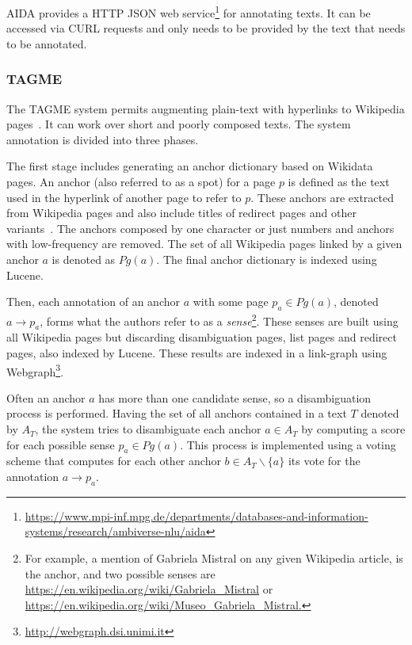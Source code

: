 AIDA provides a HTTP JSON web service\footnote{\url{https://www.mpi-inf.mpg.de/departments/databases-and-information-systems/research/ambiverse-nlu/aida}} for annotating texts. It can be accessed via CURL requests and only needs to be provided by the 
text that needs to be annotated.

\subsubsection{TAGME}
\label{cap2:theoFrame/infExtr/entityLinking/tagme}
The TAGME system permits augmenting plain-text with hyperlinks to Wikipedia 
pages~\cite{EL:tagme-FerraginaS10}. It can work over short and poorly composed texts. The system 
annotation is divided into three phases.

The first stage includes generating an anchor dictionary based on Wikidata pages. An anchor 
(also referred to as a spot) for a page $p$ is defined as the text used in the hyperlink of 
another page to refer to $p$. These anchors are extracted from Wikipedia pages and also include 
titles of redirect pages and other variants~\cite{entLib:Cucerzan07}. The anchors composed by 
one character or just numbers and anchors with low-frequency are removed. The set of all 
Wikipedia pages linked by a given anchor $a$ is denoted as $Pg(a)$. The final anchor dictionary 
is indexed using Lucene. 

Then, each annotation of an anchor $a$ with some page $p_a \in Pg(a)$, denoted 
$a \rightarrow p_a$, forms what the authors refer to as a \textit{sense}\footnote{For example, 
a mention of Gabriela Mistral on any given Wikipedia article,  is the 
anchor, and two possible senses are \url{https://en.wikipedia.org/wiki/Gabriela\_Mistral} or 
\url{https://en.wikipedia.org/wiki/Museo\_Gabriela\_Mistral.}}. These senses are built using all 
Wikipedia pages but discarding disambiguation pages, list pages and redirect pages, also indexed 
by Lucene. These results are indexed in a link-graph using 
Webgraph\footnote{\url{http://webgraph.dsi.unimi.it}}.

Often an anchor $a$ has more than one candidate sense, so a disambiguation process is performed. 
Having the set of all anchors contained in a text $T$ denoted by $A_T$, the system tries to 
disambiguate each anchor $a \in A_T$ by computing a score for each possible sense 
$p_a \in Pg(a)$. This process is implemented using a voting scheme that computes for each other 
anchor $b \in A_T \backslash \{a\}$ its vote for the annotation $a \rightarrow p_a$.

